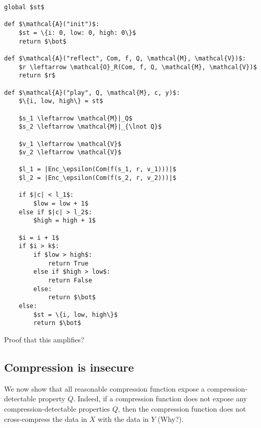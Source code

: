 \documentclass{article}
\begin{document}
\begin{lstlisting}[texcl,mathescape]
global $st$

def $\mathcal{A}("init")$:
    $st = \{i: 0, low: 0, high: 0\}$
    return $\bot$

def $\mathcal{A}("reflect", Com, f, Q, \mathcal{M}, \mathcal{V})$:
    $r \leftarrow \mathcal{O}_R(Com, f, Q, \mathcal{M}, \mathcal{V})$
    return $r$

def $\mathcal{A}("play", Q, \mathcal{M}, c, y)$:
    $\{i, low, high\} = st$
    
    $s_1 \leftarrow \mathcal{M}|_Q$
    $s_2 \leftarrow \mathcal{M}|_{\lnot Q}$

    $v_1 \leftarrow \mathcal{V}$
    $v_2 \leftarrow \mathcal{V}$

    $l_1 = |Enc_\epsilon(Com(f(s_1, r, v_1)))|$
    $l_2 = |Enc_\epsilon(Com(f(s_2, r, v_2)))|$

    if $|c| < l_1$:
        $low = low + 1$
    else if $|c| > l_2$:
        $high = high + 1$
    
    $i = i + 1$
    if $i > k$:
        if $low > high$:
            return True
        else if $high > low$:
            return False
        else:
            return $\bot$
    else:
        $st = \{i, low, high\}$
        return $\bot$
\end{lstlisting}

Proof that this amplifies?

\subsection{Compression is insecure}

We now show that all reasonable compression function expose a compression-detectable property $Q$. Indeed, if a compression function does not expose any compression-detectable properties $Q$, then the compression function does not cross-compress the data in $X$ with the data in $Y$ (Why?).
\end{document}
